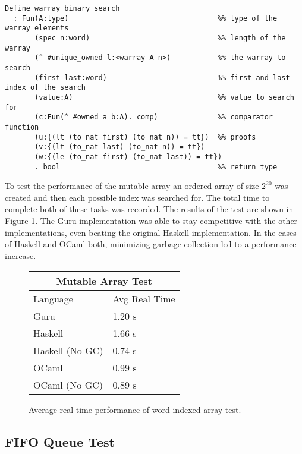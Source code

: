 \documentclass[9pt,natbib]{sigplanconf}
\begin{document}
\begin{figure*}
\begin{verbatim}
Define warray_binary_search
  : Fun(A:type)                                   %% type of the warray elements
       (spec n:word)                              %% length of the warray
       (^ #unique_owned l:<warray A n>)           %% the warray to search
       (first last:word)                          %% first and last index of the search
       (value:A)                                  %% value to search for
       (c:Fun(^ #owned a b:A). comp)              %% comparator function
       (u:{(lt (to_nat first) (to_nat n)) = tt})  %% proofs
       (v:{(lt (to_nat last) (to_nat n)) = tt})
       (w:{(le (to_nat first) (to_nat last)) = tt})
       . bool                                     %% return type
\end{verbatim}
\caption{The type of the binary search algorithm for word indexed arrays.}
\label{bs}
\end{figure*}

To test the performance of the mutable array an ordered array of size $2^{20}$ was created and then each possible index was searched for.  The total time to complete both of these tasks was recorded.  The results of the test are shown in Figure \ref{warraystats}.  The Guru implementation was able to stay competitive with the other implementations, even beating the original Haskell implementation.  In the cases of Haskell and OCaml both, minimizing garbage collection led to a performance increase.

\begin{figure}
\begin{tabular}{| l | l |}
\hline
\multicolumn{2}{|c|}{Mutable Array Test} \\
\hline
Language & Avg Real Time \\
\hline
Guru & 1.20 s \\
Haskell & 1.66 s\\
Haskell (No GC) & 0.74 s \\
OCaml & 0.99 s \\
OCaml (No GC) & 0.89 s \\
\hline
\end{tabular}
\caption{Average real time performance of word indexed array test.}
\label{warraystats}
\end{figure}

\subsection{FIFO Queue Test}
\end{document}

